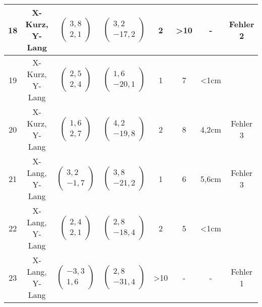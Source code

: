 \begin{appendix}
\begin{center}
\begin{longtable}{|c|c|c|c|c|c|c|c|}
    		\hline
    		18 & X-Kurz, Y-Lang &  $\left(\begin{array}{c} 3,8 \\ 2,1\end{array}\right)$ & $\left(\begin{array}{c} 3,2 \\ -17,2\end{array}\right)$ & 2& >10& -& Fehler 2\\
    		\hline
    		19 & X-Kurz, Y-Lang &  $\left(\begin{array}{c} 2,5 \\ 2,4\end{array}\right)$ & $\left(\begin{array}{c} 1,6 \\ -20,1\end{array}\right)$ & 1& 7& <1cm& \checkmark\\
    		\hline
    		20 & X-Kurz, Y-Lang &  $\left(\begin{array}{c} 1,6 \\ 2,7\end{array}\right)$ & $\left(\begin{array}{c} 4,2 \\ -19,8\end{array}\right)$ & 2& 8& 4,2cm& Fehler 3\\
    		\hline
    		21 & X-Lang, Y-Lang &  $\left(\begin{array}{c} 3,2 \\ -1,7\end{array}\right)$ & $\left(\begin{array}{c} 3,8 \\ -21,2\end{array}\right)$ & 1& 6& 5,6cm& Fehler 3\\
    		\hline
    		22 & X-Lang, Y-Lang &  $\left(\begin{array}{c} 2,4 \\ 2,1\end{array}\right)$ & $\left(\begin{array}{c} 2,8 \\ -18,4\end{array}\right)$ & 2& 5& <1cm& \checkmark\\
    		\hline
    		23 & X-Lang, Y-Lang &  $\left(\begin{array}{c} -3,3 \\ 1,6\end{array}\right)$ & $\left(\begin{array}{c} 2,8 \\ -31,4\end{array}\right)$ & >10& -& -& Fehler 1\\

\end{longtable}
\end{center}
\end{appendix}
